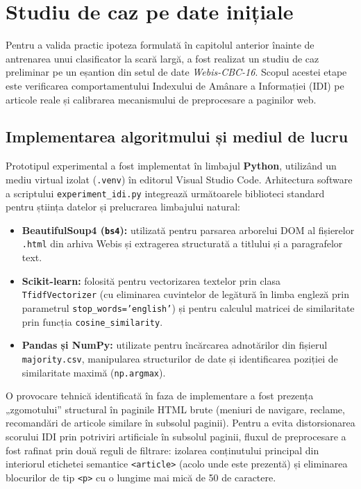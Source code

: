 \documentclass[12pt, a4paper]{article}
\begin{document}
\section{Studiu de caz pe date inițiale}

Pentru a valida practic ipoteza formulată în capitolul anterior înainte de antrenarea unui clasificator la scară largă, a fost realizat un studiu de caz preliminar pe un eșantion din setul de date \textit{Webis-CBC-16}. Scopul acestei etape este verificarea comportamentului Indexului de Amânare a Informației (IDI) pe articole reale și calibrarea mecanismului de preprocesare a paginilor web.

\subsection{Implementarea algoritmului și mediul de lucru}

Prototipul experimental a fost implementat în limbajul \textbf{Python}, utilizând un mediu virtual izolat (\texttt{.venv}) în editorul Visual Studio Code. Arhitectura software a scriptului \texttt{experiment\_idi.py} integrează următoarele biblioteci standard pentru știința datelor și prelucrarea limbajului natural:

\begin{itemize}
    \item \textbf{BeautifulSoup4 (\texttt{bs4}):} utilizată pentru parsarea arborelui DOM al fișierelor \texttt{.html} din arhiva Webis și extragerea structurată a titlului și a paragrafelor text.
    \item \textbf{Scikit-learn:} folosită pentru vectorizarea textelor prin clasa \texttt{TfidfVectorizer} (cu eliminarea cuvintelor de legătură în limba engleză prin parametrul \texttt{stop\_words='english'}) și pentru calculul matricei de similaritate prin funcția \texttt{cosine\_similarity}.
    \item \textbf{Pandas și NumPy:} utilizate pentru încărcarea adnotărilor din fișierul \texttt{majority.csv}, manipularea structurilor de date și identificarea poziției de similaritate maximă (\texttt{np.argmax}).
\end{itemize}

O provocare tehnică identificată în faza de implementare a fost prezența „zgomotului” structural în paginile HTML brute (meniuri de navigare, reclame, recomandări de articole similare în subsolul paginii). Pentru a evita distorsionarea scorului IDI prin potriviri artificiale în subsolul paginii, fluxul de preprocesare a fost rafinat prin două reguli de filtrare: izolarea conținutului principal din interiorul etichetei semantice \texttt{<article>} (acolo unde este prezentă) și eliminarea blocurilor de tip \texttt{<p>} cu o lungime mai mică de 50 de caractere.
\end{document}
